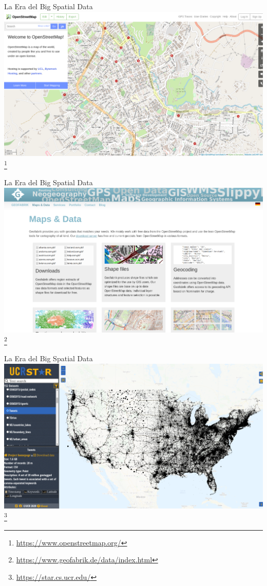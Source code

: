 \documentclass{beamer}
\newcommand\blfootnote[1]{%
  \begingroup
  \renewcommand\thefootnote{}\footnote{#1}%
  \addtocounter{footnote}{-1}%
  \endgroup
}
\begin{document}
\begin{frame}{La Era del Big Spatial Data}
  \centering
  \includegraphics[width=\textwidth]{figures/osm}
  \blfootnote{\url{https://www.openstreetmap.org/}}
\end{frame}

\begin{frame}{La Era del Big Spatial Data}
  \centering
  \includegraphics[width=\textwidth]{figures/geofabrik}
  \blfootnote{\url{https://www.geofabrik.de/data/index.html}}
\end{frame}

\begin{frame}{La Era del Big Spatial Data}
  \centering
  \includegraphics[width=\textwidth]{figures/star}
  \blfootnote{\url{https://star.cs.ucr.edu/}}
\end{frame}
\end{document}
